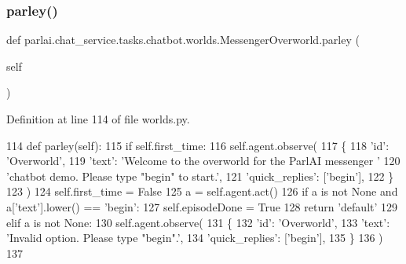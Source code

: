 \subsubsection{\texorpdfstring{parley()}{parley()}}
{\footnotesize\ttfamily def parlai.\+chat\+\_\+service.\+tasks.\+chatbot.\+worlds.\+Messenger\+Overworld.\+parley (\begin{DoxyParamCaption}\item[{}]{self }\end{DoxyParamCaption})}



Definition at line 114 of file worlds.\+py.


\begin{DoxyCode}
114     \textcolor{keyword}{def }parley(self):
115         \textcolor{keywordflow}{if} self.first\_time:
116             self.agent.observe(
117                 \{
118                     \textcolor{stringliteral}{'id'}: \textcolor{stringliteral}{'Overworld'},
119                     \textcolor{stringliteral}{'text'}: \textcolor{stringliteral}{'Welcome to the overworld for the ParlAI messenger '}
120                     \textcolor{stringliteral}{'chatbot demo. Please type "begin" to start.'},
121                     \textcolor{stringliteral}{'quick\_replies'}: [\textcolor{stringliteral}{'begin'}],
122                 \}
123             )
124             self.first\_time = \textcolor{keyword}{False}
125         a = self.agent.act()
126         \textcolor{keywordflow}{if} a \textcolor{keywordflow}{is} \textcolor{keywordflow}{not} \textcolor{keywordtype}{None} \textcolor{keywordflow}{and} a[\textcolor{stringliteral}{'text'}].lower() == \textcolor{stringliteral}{'begin'}:
127             self.episodeDone = \textcolor{keyword}{True}
128             \textcolor{keywordflow}{return} \textcolor{stringliteral}{'default'}
129         \textcolor{keywordflow}{elif} a \textcolor{keywordflow}{is} \textcolor{keywordflow}{not} \textcolor{keywordtype}{None}:
130             self.agent.observe(
131                 \{
132                     \textcolor{stringliteral}{'id'}: \textcolor{stringliteral}{'Overworld'},
133                     \textcolor{stringliteral}{'text'}: \textcolor{stringliteral}{'Invalid option. Please type "begin".'},
134                     \textcolor{stringliteral}{'quick\_replies'}: [\textcolor{stringliteral}{'begin'}],
135                 \}
136             )
137 \end{DoxyCode}
\mbox{\label{classparlai_1_1chat__service_1_1tasks_1_1chatbot_1_1worlds_1_1MessengerOverworld_a2d75637f8244dae022878440a267f3ac}} 
